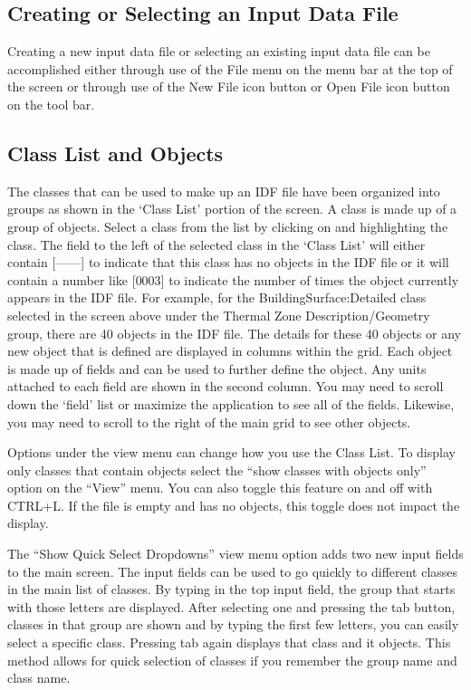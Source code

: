 \subsection{Creating or Selecting an Input Data File}\label{creating-or-selecting-an-input-data-file}

Creating a new input data file or selecting an existing input data file can be accomplished either through use of the File menu on the menu bar at the top of the screen or through use of the New File icon button or Open File icon button on the tool bar.

\subsection{Class List and Objects}\label{class-list-and-objects}

The classes that can be used to make up an IDF file have been organized into groups as shown in the `Class List' portion of the screen. A class is made up of a group of objects. Select a class from the list by clicking on and highlighting the class. The field to the left of the selected class in the `Class List' will either contain {[}------{]} to indicate that this class has no objects in the IDF file or it will contain a number like {[}0003{]} to indicate the number of times the object currently appears in the IDF file. For example, for the BuildingSurface:Detailed class selected in the screen above under the Thermal Zone Description/Geometry group, there are 40 objects in the IDF file. The details for these 40 objects or any new object that is defined are displayed in columns within the grid. Each object is made up of fields and can be used to further define the object. Any units attached to each field are shown in the second column. You may need to scroll down the `field' list or maximize the application to see all of the fields. Likewise, you may need to scroll to the right of the main grid to see other objects.

Options under the view menu can change how you use the Class List. To display only classes that contain objects select the ``show classes with objects only'' option on the ``View'' menu. You can also toggle this feature on and off with CTRL+L. If the file is empty and has no objects, this toggle does not impact the display.

The ``Show Quick Select Dropdowns'' view menu option adds two new input fields to the main screen. The input fields can be used to go quickly to different classes in the main list of classes. By typing in the top input field, the group that starts with those letters are displayed. After selecting one and pressing the tab button, classes in that group are shown and by typing the first few letters, you can easily select a specific class. Pressing tab again displays that class and it objects. This method allows for quick selection of classes if you remember the group name and class name.

